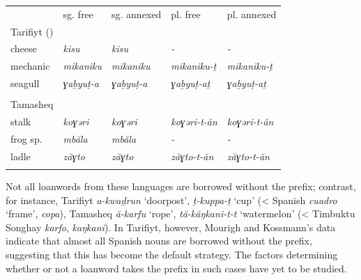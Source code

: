 \documentclass[output=paper]{langscibook}
\begin{document}
\begin{styleLangsciTableHeading}%
\begin{table}
\caption{Some prefixless loanwords in Tarifiyt (< Spanish) and Tamasheq (< Songhay)}
\label{tab:key:7}
\end{table}\end{styleLangsciTableHeading}


\begin{tabularx}{\textwidth}{XXXXX}
 & sg. free & sg. annexed & pl. free & pl. annexed\\
\lsptoprule
Tarifiyt (\citealt{MourighKossmann2020}) &  &  &  & \\
cheese & \textit{kisu} & \textit{kisu} & \textit{{}-} & \textit{{}-}\\
mechanic & \textit{mikaniku} & \textit{mikaniku} & \textit{mikaniku-ṯ} & \textit{mikaniku-ṯ}\\
seagull & \textit{ɣaḇyuṭ-a} & \textit{ɣaḇyuṭ-a} & \textit{ɣaḇyuṭ-aṯ} & \textit{ɣaḇyuṭ-aṯ}\\
&  &  &  & \\
Tamasheq \citep{Heath2006} &  &  &  & \\
stalk & \textit{koɣəri} & \textit{koɣəri} & \textit{koɣəri-t-ăn} & \textit{koɣəri-t-ăn}\\
frog sp. & \textit{mbăla} & \textit{mbăla} & \textit{{}-} & \textit{{}-}\\
ladle & \textit{zăɣto} & \textit{zăɣto} & \textit{zăɣto-t-ăn} & \textit{zăɣto-t-ăn}\\
\lspbottomrule
\end{tabularx}
\begin{styleStandarduser}
Not all loanwords from these languages are borrowed without the prefix; contrast, for instance, Tarifiyt \textit{a-kwaḏrun} ‘doorpost’, \textit{ṯ-kuppa-ṯ} ‘cup’ (< Spanish \textit{cuadro} ‘frame’, \textit{copa}), Tamasheq \textit{ă-karfu} ‘rope’, \textit{tă-kăŋkani-t-t} ‘watermelon’ (< Timbuktu Songhay \textit{karfo}, \textit{kaŋkani}). In Tarifiyt, however, Mourigh and Kossmann’s data indicate that almost all Spanish nouns are borrowed without the prefix, suggesting that this has become the default strategy. The factors determining whether or not a loanword takes the prefix in such cases have yet to be studied.
\end{styleStandarduser}
\end{document}

